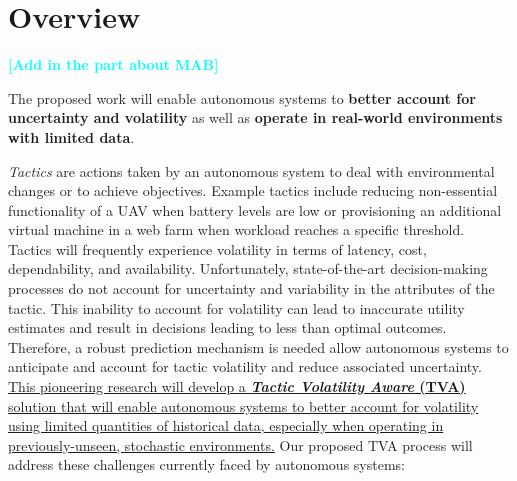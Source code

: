 \documentclass{article}
\title{\Title}
\author{
	\textbf{TPOC:} Daniel E. Krutz \{dxkvse@rit.edu\}\\
}
\date{} %
\newcommand{\todo}[1]{\textcolor{cyan}{\textbf{[#1]}}}
\begin{document}
\maketitle

\section{Overview}

\todo{Add in the part about MAB}

The proposed work will enable autonomous systems to \textbf{better account for uncertainty and volatility} as well as \textbf{operate in real-world environments with limited data}.

\emph{Tactics} are actions taken by an autonomous system to deal with environmental changes or to achieve objectives. Example tactics include reducing non-essential functionality of a UAV when battery levels are low or provisioning an additional virtual machine in a web farm when workload reaches a specific threshold. Tactics will frequently experience volatility in terms of latency, cost, dependability, and availability. Unfortunately, state-of-the-art decision-making processes do not account for uncertainty and variability in the attributes of the tactic. This inability to account for volatility can lead to inaccurate utility estimates and result in decisions leading to less than optimal outcomes. Therefore, a robust prediction mechanism is needed allow autonomous systems to anticipate and account for tactic volatility and reduce associated uncertainty. \ul{This pioneering research will develop a \textbf{\emph{Tactic Volatility Aware} (TVA)} solution that will enable autonomous systems to better account for volatility using limited quantities of historical data, especially when operating in previously-unseen, stochastic environments.} Our proposed TVA process will address these challenges currently faced by autonomous systems: 


\end{document}
